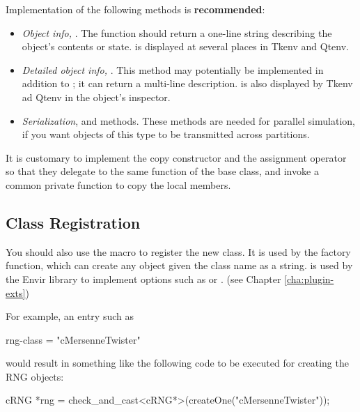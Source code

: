 Implementation of the following methods is \textbf{recommended}:

\begin{itemize}
  \item{\textit{Object info,} . The  function
        should return a one-line string describing the object's contents or state.
         is displayed at several places in Tkenv and Qtenv.}
  \item{\textit{Detailed object info,} .
        This method may potentially be implemented in addition to ;
        it can return a multi-line description.  is also
        displayed by Tkenv ad Qtenv in the object's inspector.}
  \item{\textit{Serialization},  and  methods.
        These methods are needed for parallel simulation, if you want
        objects of this type to be transmitted across partitions.}
\end{itemize}

It is customary to implement the copy constructor and the assignment operator
so that they delegate to the same function of the base class, and invoke a common
private  function to copy the local members.

\subsection{Class Registration}
\label{sec:sim-lib:class-registration}

You should also use the  macro to register the
new class. It is used by the  factory function, which can
create any object given the class name as a string. 
is used by the Envir library to implement  options
such as  or .
(see Chapter \ref{cha:plugin-exts})

For example, an  entry such as

\begin{inifile}
rng-class = "cMersenneTwister"
\end{inifile}

would result in something like the following code to be executed
for creating the RNG objects:

\begin{cpp}
cRNG *rng = check_and_cast<cRNG*>(createOne("cMersenneTwister"));
\end{cpp}


